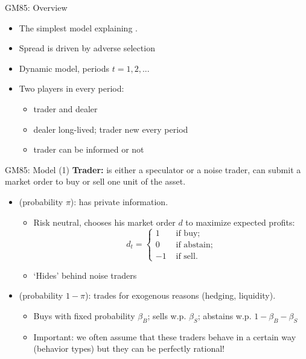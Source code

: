 \documentclass[english,10pt]{beamer}
\begin{document}
\begin{frame}{GM85: Overview}
	\begin{itemize}
		\item The simplest model explaining .
		\item Spread is driven by adverse selection
		\item Dynamic model, periods $t = 1,2,...$
		\item Two players in every period:
		\begin{itemize}
			\item trader and dealer
			\item dealer long-lived; trader new every period
			\item trader can be informed or not
		\end{itemize}
	\end{itemize}
\end{frame}



\begin{frame}{GM85: Model (1)}
	\textbf{Trader:} is either a speculator or a noise trader, can submit a market order to buy or sell one unit of the asset.
	\begin{itemize}
		\item {} (probability $\pi$): has private information.
		\begin{itemize}
			\item Risk neutral, chooses his market order $d$ to maximize expected profits:
			\begin{equation*}
				d_t= \left\{
				\begin{aligned}
				1	& \text{ if buy}; \\
				0	& \text{ if abstain}; \\
				-1	& \text{ if sell}.
				\end{aligned}
				\right.
			\end{equation*}
			\item `Hides' behind noise traders
		\end{itemize}
		\item {} (probability $1-\pi$): trades for exogenous reasons (hedging, liquidity).
		\begin{itemize}
			\item Buys with fixed probability $\beta_B$; sells w.p. $\beta_S$; abstains w.p. $1-\beta_B - \beta_S$
			\item \alert{Important}: we often assume that these traders behave in a certain way (behavior types) but they can be perfectly rational!
		\end{itemize}
	\end{itemize}
\end{frame}
\end{document}
